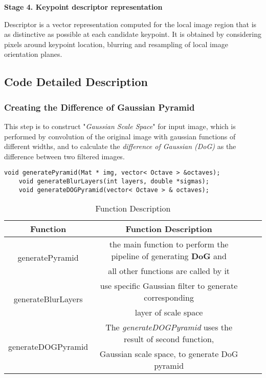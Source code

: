 \documentclass[paper=a4, fontsize=11pt]{scrartcl} %
\numberwithin{equation}{section} %
\numberwithin{figure}{section} %
\numberwithin{table}{section} %
\begin{document}
\textbf{Stage 4. Keypoint descriptor representation}

Descriptor is a vector representation computed for the local image region that is as distinctive as possible at each candidate keypoint. It is obtained by considering pixels around keypoint location, blurring and resampling of local image orientation planes. 

\subsection{Code Detailed Description}

\subsubsection{Creating the Difference of Gaussian Pyramid}

This step is to construct "\textsl{Gaussian Scale Space}" for input image, which is performed by convolution of the original image with gaussian functions of different widths, and to calculate the \textsl{difference of Gaussian (DoG)} as the difference between two filtered images.

\begin{lstlisting}
void generatePyramid(Mat * img, vector< Octave > &octaves);
    void generateBlurLayers(int layers, double *sigmas);
    void generateDOGPyramid(vector< Octave > & octaves);
\end{lstlisting}

\begin{table}[h]
    \centering
    \begin{tabular}{|c|c| lp{}}
        \hline
        \textbf{Function} & \textbf{Function Description} \\\hline
          \multirow{2}{*}{generatePyramid} & the main function to perform the pipeline of generating \textbf{DoG} and \\ & all other 
                                           functions are called by it \\\hline
                                           \multirow{2}{*}{generateBlurLayers} & use specific Gaussian filter to generate corresponding \\ & layer of scale space\\\hline
                                           \multirow{2}{*}{generateDOGPyramid} & The \textsl{generateDOGPyramid} uses the result of second function, \\&Gaussian scale space, to generate DoG pyramid\\\hline
    \end{tabular}
    \caption{Function Description}\label{nolock}
\end{table}
\end{document}
